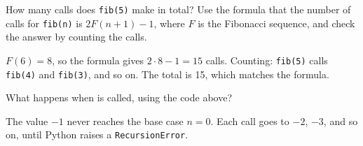 \begin{Exercise}[label=rec4, title=Counting calls]
How many calls does \texttt{fib(5)} make in total? Use the formula that the number of calls for \texttt{fib(n)} is $2F(n+1) - 1$, where $F$ is the Fibonacci sequence, and check the answer by counting the calls.
\end{Exercise}
\begin{Answer}[ref=rec4]
$F(6) = 8$, so the formula gives $2 \cdot 8 - 1 = 15$ calls. Counting: \texttt{fib(5)} calls \texttt{fib(4)} and \texttt{fib(3)}, and so on. The total is 15, which matches the formula.
\end{Answer}

\begin{Exercise}[label=rec3, title=Missing base case]
What happens when  is called, using the code above?
\end{Exercise}
\begin{Answer}[ref=rec3]
The value $-1$ never reaches the base case $n = 0$. Each call goes to $-2$, $-3$,
and so on, until Python raises a \texttt{RecursionError}.
\end{Answer}
